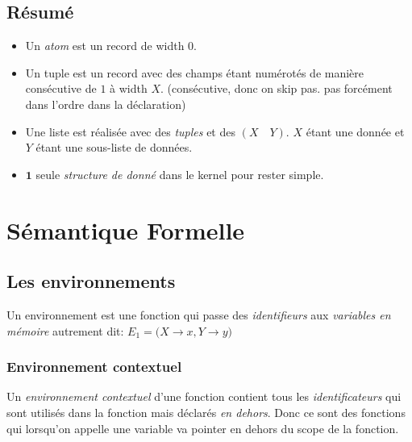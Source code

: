 \documentclass{report}
\begin{document}
\subsection{Résumé}
\begin{itemize}
\item Un \textit{atom} est un record de width $0$.
\item Un tuple est un record avec des champs étant numérotés de manière consécutive de $1$ à width $X$. (consécutive, donc on skip pas. pas forcément dans l'ordre dans la déclaration)
\item Une liste est réalisée avec des \textit{tuples} et des $(X \quad Y)$. $X$ étant une donnée et $Y$ étant une sous-liste de données.
\item $\textbf{1}$ seule \textit{structure de donné} dans le kernel pour rester simple.
\end{itemize}

\section{Sémantique Formelle}
\subsection{Les environnements}
Un environnement est une fonction qui passe des \textit{identifieurs} aux \textit{variables en mémoire} autrement dit: $E_1 = ({X \rightarrow x, Y \rightarrow y)}$

\subsubsection{Environnement contextuel}
Un \textit{environnement contextuel} d'une fonction contient tous les \textit{identificateurs} qui sont utilisés dans la fonction mais déclarés \textit{en dehors}. Donc ce sont des fonctions qui lorsqu'on appelle une variable va pointer en dehors du scope de la fonction.
\end{document}
